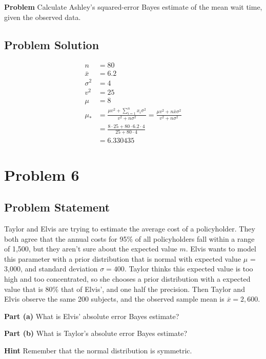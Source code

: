 \documentclass[12pt]{article}
\theoremstyle{definition}
\begin{document}
\bigskip
\noindent
{\bf Problem} Calculate Ashley's squared-error Bayes estimate of the mean wait time, given the observed data.


\subsection*{Problem Solution}
\begin{align*}
n &= 80\\
\bar{x} &= 6.2\\
\sigma^2 &= 4\\
v^2 &= 25\\
\mu &= 8\\
\mu_{*} &= \frac{\mu v^2 + \sum_{i=1}^n x_i \sigma^2}{v^2 + n\sigma^2} = \frac{\mu v^2 + n \bar{x}\sigma^2}{v^2 + n\sigma^2}\\
&= \frac{8 \cdot 25 + 80 \cdot 6.2 \cdot 4}{25 + 80 \cdot 4}\\
&= 6.330435
\end{align*}



\newpage
\section*{Problem 6}

\subsection*{Problem Statement}

Taylor and Elvis are trying to estimate the average cost of a policyholder. They both agree that the annual costs for 95\% of all policyholders fall within a range of 1,500, but they aren't sure about the expected value $m$. Elvis wants to model this parameter with a prior distribution that is normal with expected value $\mu$ = 3,000, and standard deviation $\sigma = 400$. Taylor thinks this expected value is too high and too concentrated, so she chooses a prior distribution with a expected value that is 80\% that of Elvis', and one half the precision. Then Taylor and Elvis observe the same 200 subjects, and the observed sample mean is $\overline{x} = 2,600$.

\bigskip
\noindent
{\bf Part (a)} What is Elvis' absolute error Bayes estimate?

\bigskip
\noindent
{\bf Part (b)} What is Taylor's absolute error Bayes estimate?

\bigskip
\noindent
{\bf Hint} Remember that the normal distribution is symmetric.
\end{document}
